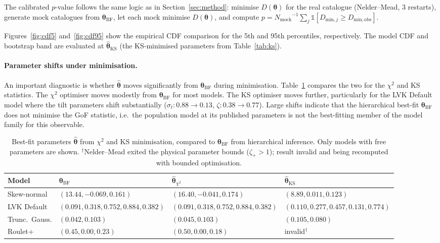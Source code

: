 \documentclass[11pt,a4paper]{article}
\newcommand{\Nmock}{\ensuremath{N_\mathrm{mock}}\xspace}
\begin{document}
The calibrated $p$-value follows the same logic as in
Section~\ref{sec:method}: minimise $D(\boldsymbol{\theta})$ for the
real catalogue (Nelder--Mead, 3 restarts), generate mock catalogues from
$\boldsymbol{\theta}_\mathrm{BF}$, let each mock minimise
$D(\boldsymbol{\theta})$, and compute
$p = \Nmock^{-1}\sum_j \mathbb{1}[D_{\mathrm{min},j} \ge D_\mathrm{min,obs}]$.

Figures~\ref{fig:cdf5} and~\ref{fig:cdf95} show the empirical CDF
comparison for the 5th and 95th percentiles, respectively.
The model CDF and bootstrap band are evaluated at
$\hat{\boldsymbol{\theta}}_\mathrm{KS}$ (the KS-minimised parameters
from Table~\ref{tab:ks}).

\paragraph{Parameter shifts under minimisation.}
An important diagnostic is whether $\hat{\boldsymbol{\theta}}$ moves
significantly from $\boldsymbol{\theta}_\mathrm{BF}$ during
minimisation.  Table~\ref{tab:shifts} compares the two for the $\chi^2$
and KS statistics.  The $\chi^2$ optimiser moves modestly from
$\boldsymbol{\theta}_\mathrm{BF}$ for most models.  The KS optimiser
moves further, particularly for the LVK Default model where the tilt
parameters shift substantially ($\sigma_t: 0.88 \to 0.13$, $\zeta:
0.38 \to 0.77$).  Large shifts indicate that the hierarchical best-fit
$\boldsymbol{\theta}_\mathrm{BF}$ does not minimise the GoF statistic,
i.e.\ the population model at its published parameters is not the
best-fitting member of the model family for this observable.

\begin{table}[htbp]
\centering
\caption{Best-fit parameters $\hat{\boldsymbol{\theta}}$ from $\chi^2$
and KS minimisation, compared to $\boldsymbol{\theta}_\mathrm{BF}$ from
hierarchical inference.  Only models with free parameters are shown.
$^\dagger$Nelder--Mead exited the physical parameter bounds
($\zeta_+ > 1$); result invalid and being recomputed with
bounded optimisation.}
\label{tab:shifts}
\small
\begin{tabular}{lp{3.8cm}p{3.8cm}p{3.8cm}}
\toprule
Model & $\boldsymbol{\theta}_\mathrm{BF}$ & $\hat{\boldsymbol{\theta}}_{\chi^2}$ & $\hat{\boldsymbol{\theta}}_\mathrm{KS}$ \\
\midrule
Skew-normal & $(13.44, -0.069, 0.161)$ & $(16.40, -0.041, 0.174)$ & $(8.89, 0.011, 0.123)$ \\
LVK Default & $(0.091, 0.318, 0.752, 0.884, 0.382)$ & $(0.091, 0.318, 0.752, 0.884, 0.382)$ & $(0.110, 0.277, 0.457, 0.131, 0.774)$ \\
Trunc.\ Gauss. & $(0.042, 0.103)$ & $(0.045, 0.103)$ & $(0.105, 0.080)$ \\
Roulet+ & $(0.45, 0.00, 0.23)$ & $(0.50, 0.00, 0.18)$ & invalid$^\dagger$ \\
\bottomrule
\end{tabular}
\end{table}
\end{document}
